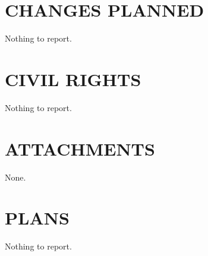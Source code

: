\documentclass[12pt,letterpaper,english,bibliography=totocnumbered,abstract=on]{scrartcl}
\begin{document}
\section{CHANGES PLANNED}


Nothing to report.


\section{CIVIL RIGHTS}


Nothing to report.

\section{ATTACHMENTS}


None.

\section{PLANS}


Nothing to report.
\end{document}
